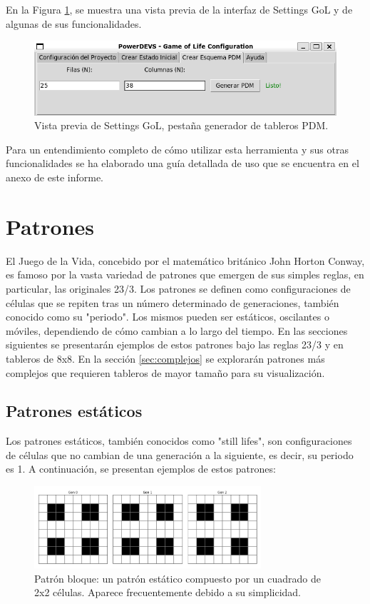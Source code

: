 \documentclass[]{article}
\begin{document}
En la Figura \ref{fig:settingsdevs}, se muestra una vista previa de la interfaz de Settings GoL y de algunas de sus funcionalidades.

\begin{figure}[H]
  \centering
  \includegraphics[width=1\textwidth]{../assets/pdevs/SettingsDevs.png}
  \caption{Vista previa de Settings GoL, pestaña generador de tableros PDM.}
  \label{fig:settingsdevs}
\end{figure}

Para un entendimiento completo de cómo utilizar esta herramienta y sus otras funcionalidades se ha elaborado una guía detallada de uso que se encuentra en el anexo de este informe.



\section{Patrones}
El Juego de la Vida, concebido por el matemático británico John Horton Conway, es famoso por la vasta variedad de patrones que emergen de sus simples reglas, en particular, las originales 23/3. Los patrones se definen como configuraciones de células que se repiten tras un número determinado de generaciones, también conocido como su "periodo". Los mismos pueden ser estáticos, oscilantes o móviles, dependiendo de cómo cambian a lo largo del tiempo. En las secciones siguientes se presentarán ejemplos de estos patrones bajo las reglas 23/3 y en tableros de 8x8.
En la sección \ref{sec:complejos} se explorarán patrones más complejos que requieren tableros de mayor tamaño para su visualización.

\subsection{Patrones estáticos}
Los patrones estáticos, también conocidos como "still lifes", son configuraciones de células que no cambian de una generación a la siguiente, es decir, su periodo es 1. A continuación, se presentan ejemplos de estos patrones:

\begin{figure}[H]
  \centering
  \includegraphics[width=0.75\textwidth]{../assets/still_life/block/block.png}
  \caption{Patrón bloque: un patrón estático compuesto por un cuadrado de 2x2 células. Aparece frecuentemente debido a su simplicidad.}
  \label{fig:block}
\end{figure}
\end{document}
